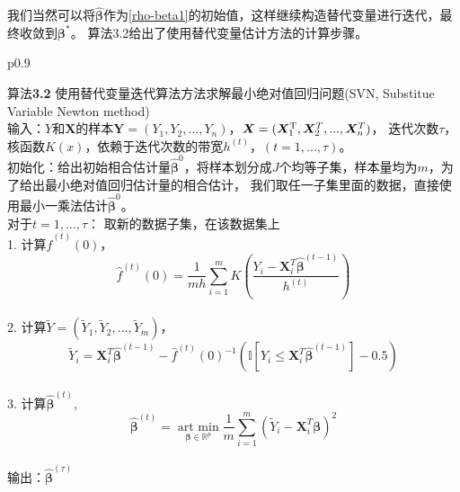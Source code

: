 我们当然可以将$\hat{\bm{\beta}}$作为\eqref{rho-beta1}的初始值，这样继续构造替代变量进行迭代，最终收敛到$\bm{\beta}^*$。
算法3.2给出了使用替代变量估计方法的计算步骤。
\begin{table}[H]%
    \centering%
    \begin{tabular}{{p{0.9\columnwidth}}}%
    
    \toprule%
    {\heiti 算法}{\bf 3.2} 使用替代变量迭代算法方法求解最小绝对值回归问题(SVN, Substitue Variable Newton method)\\
    \midrule%
    输入：$Y$和$\bm{X}$的样本$\bm{Y} = (Y_1, Y_2, ..., Y_n)$，$\bm{X} = (\bm{X}^{\rm T}_1, \bm{X}^T_2, ..., \bm{X}^T_n)$，
    迭代次数$\tau$，核函数$K(x)$，依赖于迭代次数的带宽$h^{(t)}$，$(t = 1, ..., \tau)$。
    \\
    初始化：给出初始相合估计量$\hat{\bm{\beta}}^{0} $，将样本划分成$J$个均等子集，样本量均为$m$，为了给出最小绝对值回归估计量的相合估计，
    我们取任一子集里面的数据，直接使用最小一乘法估计$\hat{\bm{\beta}}^{0}$。
    \\
    对于$t = 1, ..., \tau$：
    取新的数据子集，在该数据集上
    \\
        1. 计算$\hat{f}^{(t)}(0)$，
        $$
        \hat{f}^{(t)}(0) = \frac1{mh}\sum_{i=1}^{m}K(\frac{Y_i - \bm{X}_i^T\hat{\bm{\beta}}^{(t-1)}}{h^{(t)}})
        $$
    \\
        2. 计算$\tilde{Y} = (\tilde Y_1, \tilde Y_2, ..., \tilde Y_m)$，
        $$
        \tilde{Y}_i = \bm{X}^T_i\hat{\bm{\beta}}^{(t-1)} - \hat{f}^{(t)}(0)^{-1}
        (\mathbb{I}[Y_i \leq \bm{X}_i^T \hat{\bm{\beta}}^{(t-1)}] - 0.5)
        $$
    \\
        3. 计算$\hat{\bm{\beta}}^{(t)}$,
        $$
        \hat{\bm{\beta}}^{(t)} = \underset{\bm{\beta} \in \mathbb{R}^{p}}{\operatorname{art\ min}}
        \frac1{m}\sum_{i=1}^m (\tilde{Y}_i - \bm{X}_i^T\bm{\beta})^2
        $$
    \\
    输出：$\hat{\bm{\beta}}^{(\tau)}$
    \\
    \bottomrule%
    \end{tabular}
\end{table}%

